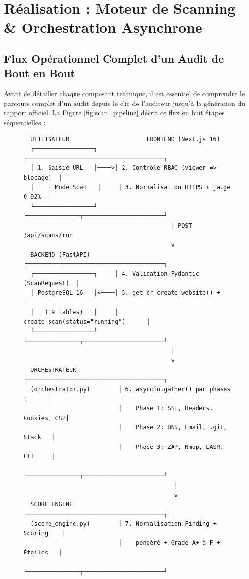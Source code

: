 \chapter[Moteur de Scan \& Orchestration]{Réalisation : Moteur de Scanning \& Orchestration Asynchrone}
\label{chap:scan}

\section{Flux Opérationnel Complet d'un Audit de Bout en Bout}
Avant de détailler chaque composant technique, il est essentiel de comprendre le parcours complet d'un audit depuis le clic de l'auditeur jusqu'à la génération du rapport officiel. La Figure \ref{fig:scan_pipeline} décrit ce flux en huit étapes séquentielles :

\begin{figure}[!htbp]
\centering
\footnotesize
\begin{verbatim}
  UTILISATEUR                      FRONTEND (Next.js 16)
  ┌─────────────────┐     ┌───────────────────────────────────────┐
  │ 1. Saisie URL   │────>│ 2. Contrôle RBAC (viewer => blocage)  │
  │    + Mode Scan   │     │ 3. Normalisation HTTPS + jauge 0-92%  │
  └─────────────────┘     └───────────────┬───────────────────────┘
                                          │ POST /api/scans/run
                                          v
  BACKEND (FastAPI)        ┌───────────────────────────────────────┐
  ┌─────────────────┐     │ 4. Validation Pydantic (ScanRequest)  │
  │ PostgreSQL 16   │<────│ 5. get_or_create_website() +          │
  │   (19 tables)   │     │    create_scan(status="running")      │
  └─────────────────┘     └───────────────┬───────────────────────┘
                                          │
                                          v
  ORCHESTRATEUR            ┌───────────────────────────────────────┐
  (orchestrator.py)        │ 6. asyncio.gather() par phases :      │
                           │    Phase 1: SSL, Headers, Cookies, CSP│
                           │    Phase 2: DNS, Email, .git, Stack   │
                           │    Phase 3: ZAP, Nmap, EASM, CTI     │
                           └───────────────┬───────────────────────┘
                                           │
                                           v
  SCORE ENGINE             ┌───────────────────────────────────────┐
  (score_engine.py)        │ 7. Normalisation Finding + Scoring    │
                           │    pondéré + Grade A+ à F + Étoiles   │
                           └───────────────┬───────────────────────┘

\end{verbatim}
\end{figure}
